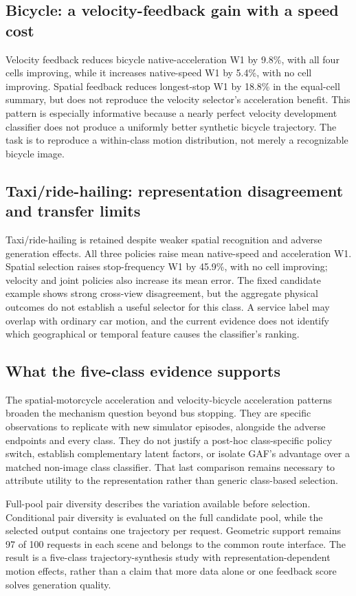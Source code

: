 \subsection{Bicycle: a velocity-feedback gain with a speed cost}
Velocity feedback reduces bicycle native-acceleration W1 by 9.8\%, with all four cells improving, while it increases native-speed W1 by 5.4\%, with no cell improving. Spatial feedback reduces longest-stop W1 by 18.8\% in the equal-cell summary, but does not reproduce the velocity selector's acceleration benefit. This pattern is especially informative because a nearly perfect velocity development classifier does not produce a uniformly better synthetic bicycle trajectory. The task is to reproduce a within-class motion distribution, not merely a recognizable bicycle image.

\subsection{Taxi/ride-hailing: representation disagreement and transfer limits}
Taxi/ride-hailing is retained despite weaker spatial recognition and adverse generation effects. All three policies raise mean native-speed and acceleration W1. Spatial selection raises stop-frequency W1 by 45.9\%, with no cell improving; velocity and joint policies also increase its mean error. The fixed candidate example shows strong cross-view disagreement, but the aggregate physical outcomes do not establish a useful selector for this class. A service label may overlap with ordinary car motion, and the current evidence does not identify which geographical or temporal feature causes the classifier's ranking.

\subsection{What the five-class evidence supports}
The spatial-motorcycle acceleration and velocity-bicycle acceleration patterns broaden the mechanism question beyond bus stopping. They are specific observations to replicate with new simulator episodes, alongside the adverse endpoints and every class. They do not justify a post-hoc class-specific policy switch, establish complementary latent factors, or isolate GAF's advantage over a matched non-image class classifier. That last comparison remains necessary to attribute utility to the representation rather than generic class-based selection.

Full-pool pair diversity describes the variation available before selection. Conditional pair diversity is evaluated on the full candidate pool, while the selected output contains one trajectory per request. Geometric support remains 97 of 100 requests in each scene and belongs to the common route interface. The result is a five-class trajectory-synthesis study with representation-dependent motion effects, rather than a claim that more data alone or one feedback score solves generation quality.
